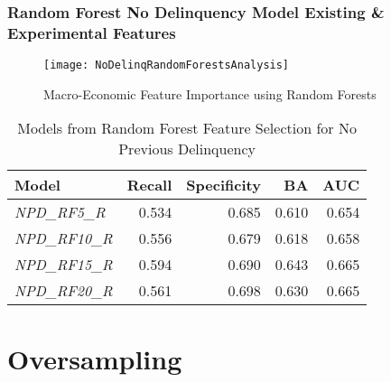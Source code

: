 \subsubsection{Random Forest No Delinquency Model Existing \& Experimental Features}

\begin{figure}[H]
	\texttt{[image: NoDelinqRandomForestsAnalysis]}
	\caption{Macro-Economic Feature Importance using Random Forests}
	\label{fig:NoDelinqRandomForestsAnalysis}
\end{figure}


\begin{table}[H]
\centering
\small
		\begin{tabular}{l  r r r r}
			\hline
			\textbf{Model}  & \textbf{Recall} & \textbf{Specificity} & \textbf{BA} & \textbf{AUC}  \\ \hline
			\textit{NPD\_RF5\_R}  & 0.534 & 0.685 & 0.610 & 0.654   \\ 
			\textit{NPD\_RF10\_R} & 0.556 & 0.679 & 0.618 & 0.658  \\ 
			\textit{NPD\_RF15\_R} & 0.594 & 0.690 & 0.643 & 0.665  \\
			\textit{NPD\_RF20\_R} & 0.561 & 0.698 & 0.630 & 0.665  \\\hline 
		\end{tabular}

	\caption{Models from Random Forest Feature Selection for No Previous Delinquency}
	\label{table:RFNPDModelResults}
\end{table}


\section{Oversampling}

